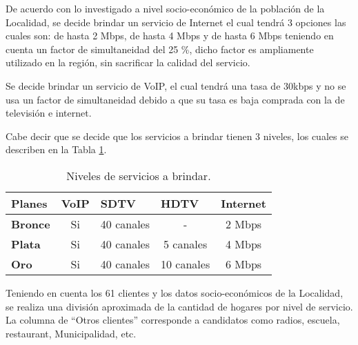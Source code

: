 De acuerdo con lo investigado a nivel socio-económico de la población de la Localidad, se decide brindar un servicio de Internet el cual tendrá 3 opciones las cuales son: de hasta 2 Mbps, de hasta 4 Mbps y de hasta 6 Mbps teniendo en cuenta un factor de simultaneidad del 25 \%, dicho factor es ampliamente utilizado en la región, sin sacrificar la calidad del servicio.  

Se decide brindar un servicio de VoIP, el cual tendrá una tasa de 30kbps y no se usa un factor de simultaneidad  debido a que su tasa es baja comprada con la de televisión e internet.

Cabe decir que se decide que los servicios a brindar tienen 3 niveles, los cuales se describen en la Tabla \ref{tab:niv-serv}.
\begin{table}[H]
  \centering
    \begin{tabular}{|l|c|c|c|c|}
    \hline
    \rowcolor[HTML]{C5D9F1} \textbf{Planes} & \multicolumn{1}{l|}{\textbf{VoIP}} & \multicolumn{1}{l|}{\textbf{SDTV}} & \multicolumn{1}{l|}{\textbf{HDTV}} & \multicolumn{1}{l|}{\textbf{Internet}} \bigstrut\\
    \hline
    \rowcolor[HTML]{C5D9F1} \textbf{Bronce} & \cellcolor[rgb]{ 1,  1,  1}Si & \cellcolor[rgb]{ 1,  1,  1}40 canales & \cellcolor[rgb]{ 1,  1,  1}- & \cellcolor[rgb]{ 1,  1,  1}2 Mbps \bigstrut\\
    \hline
    \rowcolor[HTML]{C5D9F1} \textbf{Plata} & \cellcolor[rgb]{ 1,  1,  1}Si & \cellcolor[rgb]{ 1,  1,  1}40 canales & \cellcolor[rgb]{ 1,  1,  1}5 canales & \cellcolor[rgb]{ 1,  1,  1}4 Mbps \bigstrut\\
    \hline
    \rowcolor[HTML]{C5D9F1} \textbf{Oro} & \cellcolor[rgb]{ 1,  1,  1}Si & \cellcolor[rgb]{ 1,  1,  1}40 canales & \cellcolor[rgb]{ 1,  1,  1}10 canales & \cellcolor[rgb]{ 1,  1,  1}6 Mbps \bigstrut\\
    \hline
    \end{tabular}%
  \caption{Niveles de servicios a brindar.}
  \label{tab:niv-serv}%

\end{table}%



Teniendo en cuenta los 61 clientes y los datos socio-económicos de la Localidad, se realiza una división aproximada de la cantidad de hogares por nivel de servicio. La columna de “Otros clientes” corresponde a candidatos como radios, escuela, restaurant, Municipalidad, etc.

